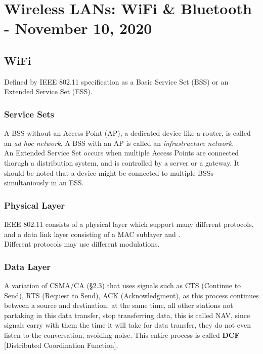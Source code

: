 \documentclass[11pt,a4paper,twoside]{book}
\begin{document}
\chapter{Wireless LANs: WiFi \& Bluetooth - November 10, 2020}

\section{WiFi}

Defined by IEEE 802.11 specification as a Basic Service Set (BSS) or an Extended Service Set (ESS).

\subsection{Service Sets}

A BSS without an Access Point (AP), a dedicated device like a router,  is called an \textit{ad hoc network}. A BSS with an AP is called an \textit{infrastructure network}.\\


An Extended Service Set occurs when multiple Access Points are connected thorugh a distribution system, and is controlled by a server or a gateway. It should be noted that a device might be connected to multiple BSSs simultaniously in an ESS.\\

\subsection{Physical Layer}

IEEE 802.11 consists of a physical layer which support many different protocols, and a data link layer consisting of a MAC sublayer and \missed.\\

Different protocols may use different modulations.

\subsection{Data Layer}

A variation of CSMA/CA (\S 2.3) that uses signals such as CTS (Continue to Send), RTS (Request to Send), ACK (Acknowledgment), as this process continues between a source and destination; at the same time, all other stations not partaking in this data transfer, stop transferring data, this is called NAV, since signals carry with them the time it will take for data transfer, they do not even listen to the conversation, avoiding noise. This entire process is called \textbf{DCF} [Distributed Coordination Function].\\
\end{document}
